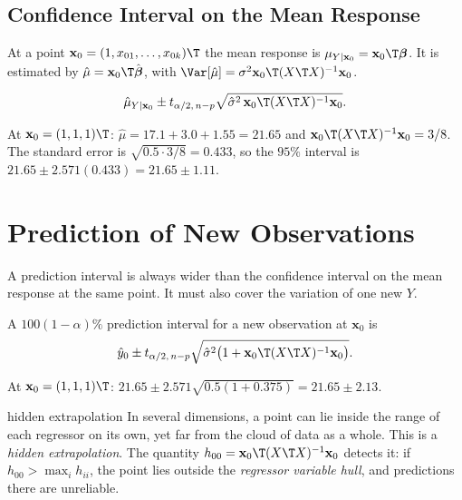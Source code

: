 \subsection{Confidence Interval on the Mean Response}

At a point $\mathbf{x}_0=(1,x_{01},\dots,x_{0k})\T$ the mean response is $\mu_{Y|\mathbf{x}_0}=\mathbf{x}_0\T\boldsymbol\beta$. It is estimated by $\hat\mu=\mathbf{x}_0\T\hat{\boldsymbol\beta}$, with $\Var[\hat\mu]=\sigma^2\mathbf{x}_0\T(X\T X)^{-1}\mathbf{x}_0$.

\begin{theorem}\label{thm:mlr-meanresp}
\[ \hat\mu_{Y|\mathbf{x}_0}\pm t_{\alpha/2,\,n-p}\sqrt{\hat\sigma^2\,\mathbf{x}_0\T(X\T X)^{-1}\mathbf{x}_0}. \]
\end{theorem}

\begin{example}
At $\mathbf{x}_0=(1,1,1)\T$: $\hat\mu=17.1+3.0+1.55=21.65$ and $\mathbf{x}_0\T(X\T X)^{-1}\mathbf{x}_0=3/8$. The standard error is $\sqrt{0.5\cdot3/8}=0.433$, so the $95\%$ interval is $21.65\pm2.571(0.433)=21.65\pm1.11$.
\end{example}

\section{Prediction of New Observations}

A prediction interval is always wider than the confidence interval on the mean response at the same point. It must also cover the variation of one new $Y$.

\begin{theorem}\label{thm:mlr-pi}
A $100(1-\alpha)\%$ prediction interval for a new observation at $\mathbf{x}_0$ is
\[ \hat{y}_0\pm t_{\alpha/2,\,n-p}\sqrt{\hat\sigma^2\big(1+\mathbf{x}_0\T(X\T X)^{-1}\mathbf{x}_0\big)}. \]
\end{theorem}

\begin{example}
At $\mathbf{x}_0=(1,1,1)\T$: $21.65\pm2.571\sqrt{0.5(1+0.375)}=21.65\pm2.13$.
\end{example}

\begin{pitfall}{hidden extrapolation}
In several dimensions, a point can lie inside the range of each regressor on its own, yet far from the cloud of data as a whole. This is a \emph{hidden extrapolation}. The quantity $h_{00}=\mathbf{x}_0\T(X\T X)^{-1}\mathbf{x}_0$ detects it: if $h_{00}>\max_ih_{ii}$, the point lies outside the \emph{regressor variable hull}, and predictions there are unreliable.
\end{pitfall}

